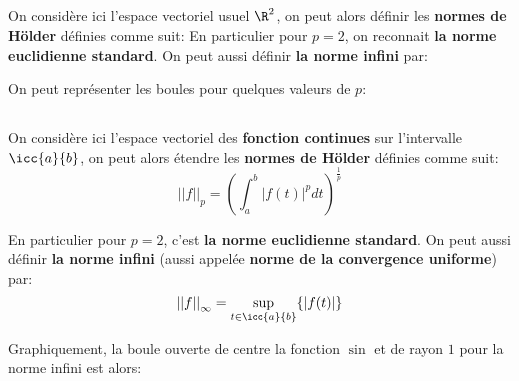 \subsection*{}
On considère ici l'espace vectoriel usuel \(\R^2\), on peut alors définir les \textbf{normes de Hölder} définies comme suit:
En particulier pour \(p=2\), on reconnait \textbf{la norme euclidienne standard}. On peut aussi définir \textbf{la norme infini} par:

On peut représenter les boules pour quelques valeurs de \(p\):
\begin{center}
\end{center}

\pagebreak
\subsection*{}
On considère ici l'espace vectoriel des \textbf{fonction continues} sur l'intervalle \(\icc{a}{b}\), on peut alors étendre les \textbf{normes de Hölder} définies comme suit:
\[ 
   {||f||}_p = \left (\int_{a}^{b} |f(t)|^p dt \right)^{\frac{1}{p}}
\]

En particulier pour \(p=2\), c'est \textbf{la norme euclidienne standard}. On peut aussi définir \textbf{la norme infini} (aussi appelée \textbf{norme de la convergence uniforme}) par:
\[ 
   {||f||}_\infty = \underset{t\in \icc{a}{b}}{\sup}\{|f(t)|\}
\]

Graphiquement, la boule ouverte de centre la fonction \(\sin\) et de rayon \(1\) pour la norme infini est alors:\<

